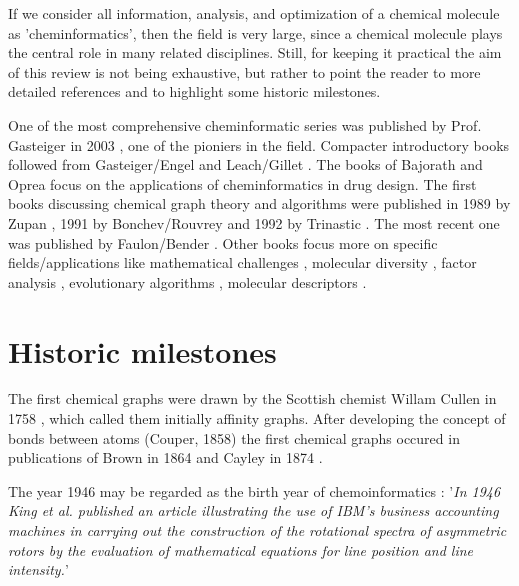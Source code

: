 \documentclass{sig-alternate}
\begin{document}
If we consider all information, analysis, and optimization of a
chemical molecule as 'cheminformatics', then the field is very large,
since a chemical molecule plays the central role in many related
disciplines. Still, for keeping it practical the aim of this review is
not being exhaustive, but rather to point the reader to more detailed
references and to highlight some historic milestones.

One of the most comprehensive cheminformatic series was published by
Prof. Gasteiger in 2003 \cite{Gasteiger2003}, one of the pioniers in
the field.  Compacter introductory books followed from Gasteiger/Engel
\cite{gasteigerengel2003} and Leach/Gillet \cite{leachgillet2007}.
The books of Bajorath \cite{Bajorath2004} and Oprea \cite{oprea2005}
focus on the applications of cheminformatics in drug design.  The
first books discussing chemical graph theory and algorithms were
published in 1989 by Zupan \cite{zupan1989}, 1991 by Bonchev/Rouvrey
\cite{bonchevrouvrey1991,bonchevrouvrey2003} and 1992 by Trinastic
\cite{Trinajstic1992}.  The most recent one was published by
Faulon/Bender \cite{faulon2010}.  Other books focus more on specific
fields/applications like mathematical challenges
\cite{mathchallenges1995}, molecular diversity
\cite{moleculardiversity1999}, factor analysis \cite{Malinowski2002},
evolutionary algorithms \cite{clark2000}, molecular descriptors
\cite{todeschini2000}.

\section{Historic milestones}
The first chemical graphs were drawn by the Scottish chemist Willam
Cullen in 1758 \cite{bonchevrouvrey1991}, which called them initially
affinity graphs.  After developing the concept of bonds between atoms
(Couper, 1858) the first chemical graphs occured in publications of
Brown in 1864 and Cayley in 1874 \cite{bonchevrouvrey1991,brown2009}.

The year 1946 may be regarded as the birth year of chemoinformatics
\cite{Chen2006}: '\textit{In 1946 King et al.\cite{kct1946} published
  an article illustrating the use of IBM's business accounting
  machines in carrying out the construction of the rotational spectra
  of asymmetric rotors by the evaluation of mathematical equations for
  line position and line intensity.}'
\end{document}
